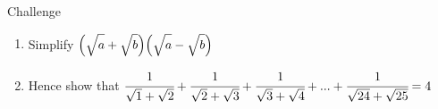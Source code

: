 \documentclass[fleqn]{article}
\begin{document}
\begin{mybox2}[colbacktitle=green]{Challenge}
	\rmfamily
	\begin{enumerate}[label=\textbf{\alph*}]
		\item Simplify $\Big(\sqrt{\strut a}+\sqrt{\strut b}\Big)\Big(\sqrt{\strut a}-\sqrt{\strut b}\Big)$
		\item \vspace{-2mm}Hence show that $\cfrac{1}{\sqrt{1}+\sqrt{2}}+\cfrac{1}{\sqrt{2}+\sqrt{3}}+\cfrac{1}{\sqrt{3}+\sqrt{4}}+...+\cfrac{1}{\sqrt{24}+\sqrt{25}}=4$
	\end{enumerate}
	
\end{mybox2}
\end{document}
